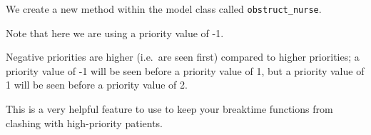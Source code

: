 \documentclass[
  letterpaper,
  DIV=11,
  numbers=noendperiod]{scrreprt}
\begin{document}
We create a new method within the model class called
\texttt{obstruct\_nurse}.

\begin{tcolorbox}[enhanced jigsaw, rightrule=.15mm, colback=white, colframe=quarto-callout-tip-color-frame, colbacktitle=quarto-callout-tip-color!10!white, toprule=.15mm, coltitle=black, opacityback=0, titlerule=0mm, bottomtitle=1mm, breakable, title=\textcolor{quarto-callout-tip-color}{\faLightbulb}\hspace{0.5em}{Tip}, opacitybacktitle=0.6, toptitle=1mm, arc=.35mm, bottomrule=.15mm, leftrule=.75mm, left=2mm]

Note that here we are using a priority value of -1.

Negative priorities are higher (i.e.~are seen first) compared to higher
priorities; a priority value of -1 will be seen before a priority value
of 1, but a priority value of 1 will be seen before a priority value of
2.

This is a very helpful feature to use to keep your breaktime functions
from clashing with high-priority patients.

\end{tcolorbox}
\end{document}
